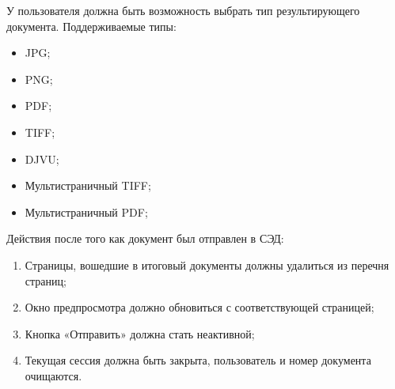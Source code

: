У пользователя должна быть возможность выбрать тип результирующего документа. Поддерживаемые типы:
\begin{itemize}
	\item JPG;
	\item PNG;
	\item PDF;
	\item TIFF;
	\item DJVU;
	\item Мультистраничный TIFF;
	\item Мультистраничный PDF;
\end{itemize}

Действия после того как документ был отправлен в СЭД:
\begin{enumerate}
	\item Страницы, вошедшие в итоговый документы должны удалиться из перечня страниц; 
	\item Окно предпросмотра должно обновиться с соответствующей страницей; 
	\item Кнопка «Отправить» должна стать неактивной;
	\item Текущая сессия должна быть закрыта, пользователь и номер документа очищаются.
\end{enumerate}

